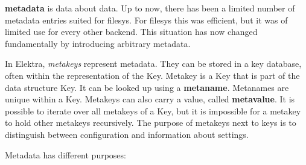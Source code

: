 {\bfseries metadata} is data about data. Up to now, there has been a limited number of metadata entries suited for {\ttfamily filesys}. For {\ttfamily filesys} this was efficient, but it was of limited use for every other backend. This situation has now changed fundamentally by introducing arbitrary metadata.

In Elektra, {\itshape metakeys} represent metadata. They can be stored in a key database, often within the representation of the {\ttfamily Key}. Metakey is a {\ttfamily Key} that is part of the data structure {\ttfamily Key}. It can be looked up using a {\bfseries metaname}. Metanames are unique within a {\ttfamily Key}. Metakeys can also carry a value, called {\bfseries metavalue}. It is possible to iterate over all metakeys of a {\ttfamily Key}, but it is impossible for a metakey to hold other metakeys recursively. The purpose of metakeys next to keys is to distinguish between configuration and information about settings.

Metadata has different purposes\+:


